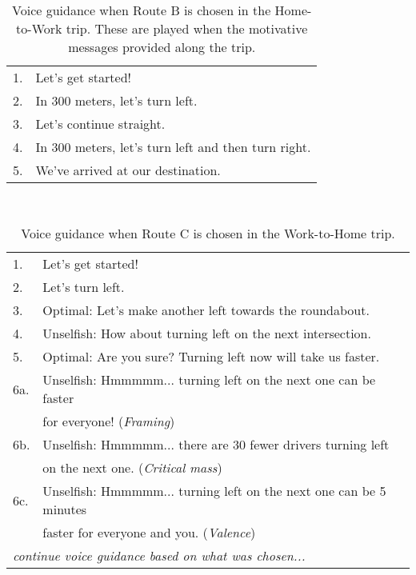 \begin{table}[h]
\centering
\caption{Voice guidance when Route B is chosen in the Home-to-Work trip. These are played when the motivative messages provided along the trip.}~\label{tab:c-motiv-B}
\begin{tabular}{ll}
\hline
1. & Let's get started!                                  \\
2. & In 300 meters, let's turn left.                     \\
3. & Let's continue straight.                            \\
4. & In 300 meters, let's turn left and then turn right. \\
5. & We've arrived at our destination.                   \\ \hline
\end{tabular}
\end{table}

\begin{table}[h]
\centering
\caption{Voice guidance when Route C is chosen in the Work-to-Home trip.}~\label{tab:c-CD}
\begin{tabular}{ll}
\hline
1.                      & Let's get started!                                                                \\
2.                      & Let's turn left.                                                                  \\ \hline
3. & Optimal: Let's make another left towards the roundabout.     \\
4. & Unselfish: How about turning left on the next intersection.  \\
5. & Optimal: Are you sure? Turning left now will take us faster. \\
6a. & Unselfish: Hmmmmm... turning left on the next one can be faster \\
    & for everyone! (\textit{Framing})                   \\
6b. & Unselfish: Hmmmmm... there are 30 fewer drivers turning left \\
    & on the next one. (\textit{Critical mass})           \\
6c. & Unselfish: Hmmmmm... turning left on the next one can be 5 minutes \\
    & faster for everyone and you. (\textit{Valence}) \\ \hline
\multicolumn{2}{l}{\textit{continue voice guidance based on what was chosen...}}                            \\ \hline
\end{tabular}
\end{table}


